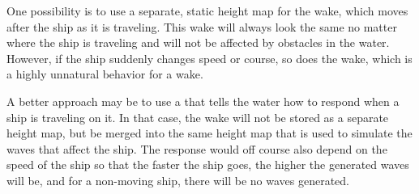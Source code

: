 One possibility is to use a separate, static height map for the wake, which moves after the ship as it is traveling. This wake will always look the same no matter where the ship is traveling and will not be affected by obstacles in the water. However, if the ship suddenly changes speed or course, so does the wake, which is a highly unnatural behavior for a wake.

A better approach may be to use a  that tells the water how to respond when a ship is traveling on it. In that case, the wake will not be stored as a separate height map, but be merged into the same height map that is used to simulate the waves that affect the ship. The response would off course also depend on the speed of the ship so that the faster the ship goes, the higher the generated waves will be, and for a non-moving ship, there will be no waves generated.